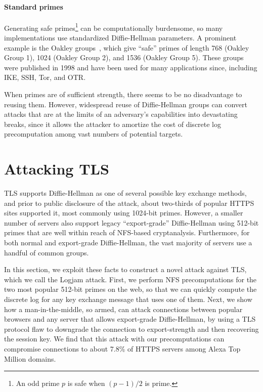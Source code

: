 \paragraph{Standard primes}
Generating safe primes\footnote{\small An odd prime $p$ is safe when $(p-1)/2$ is prime.} can be computationally
burdensome, so many implementations use standardized
Diffie-Hellman parameters.  A prominent example is the Oakley
groups~\cite{rfc2412}, which give ``safe'' primes of length 768 (Oakley Group 1), 1024 (Oakley Group 2),
and 1536 (Oakley Group 5).  These groups were published in 1998 and have been used for
many applications since, including IKE, SSH, Tor, and OTR\@.

When primes are of sufficient strength, there seems to be no
disadvantage to reusing them.  However, widespread reuse of
Diffie-Hellman groups can convert attacks that are at the limits of an
adversary's capabilities into devastating breaks, since it allows the
attacker to amortize the cost of discrete log precomputation among
vast numbers of potential targets.


\section{Attacking TLS}
\label{sec:tls}

TLS supports Diffie-Hellman as one of several possible key exchange
methods, and prior to public disclosure of the attack, about two-thirds of popular HTTPS sites supported it, most
commonly using 1024-bit primes.  However, a smaller number of servers
also support legacy ``export-grade'' Diffie-Hellman using 512-bit
primes that are well within reach of NFS-based
cryptanalysis. Furthermore, for both normal and export-grade
Diffie-Hellman, the vast majority of servers use a handful of common
groups.

In this section, we exploit these facts to construct a novel attack
against TLS\@, which we call the Logjam attack.  First, we perform NFS precomputations for the two most
popular 512-bit primes on the web, so that we can quickly compute the
discrete log for any key exchange message that uses one of them.  Next, we show
how a man-in-the-middle, so armed, can attack connections between
popular browsers and any server that allows export-grade
Diffie-Hellman, by using a TLS protocol flaw to downgrade the
connection to export-strength and then recovering the session key.  We
find that this attack with our precomputations can compromise connections to about 7.8\%
of HTTPS servers among Alexa Top Million domains.


